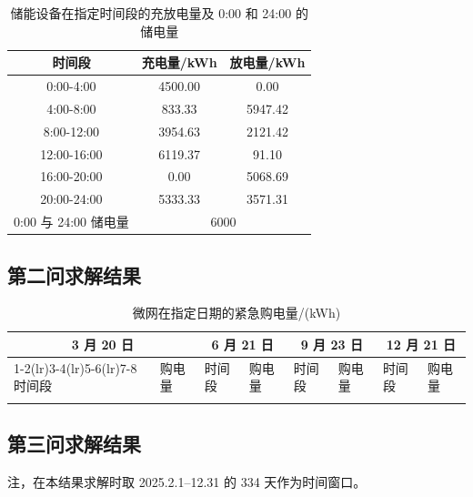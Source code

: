 \documentclass[zihao=-4,a4paper,fontset=none]{ctexart}
\begin{document}
\begin{table}[htbp]
\centering
\caption{储能设备在指定时间段的充放电量及 0:00 和 24:00 的储电量}
{\small
\begin{tabular}{ccc}
\toprule
时间段 & 充电量/kWh & 放电量/kWh \\
\midrule
0:00-4:00 & 4500.00 & 0.00 \\
4:00-8:00 & 833.33 & 5947.42 \\
8:00-12:00 & 3954.63 & 2121.42 \\
12:00-16:00 & 6119.37 & 91.10 \\
16:00-20:00 & 0.00 & 5068.69 \\
20:00-24:00 & 5333.33 & 3571.31 \\
\midrule
0:00 与 24:00 储电量 & \multicolumn{2}{c}{6000} \\
\bottomrule
\end{tabular}}
\label{tab:charge}
\end{table}
\newpage
\subsection{第二问求解结果}

\begin{table}[htbp]
\centering
\caption{微网在指定日期的紧急购电量/(kWh)}
{\footnotesize
\begin{tabular}{llllllll}
\toprule
\multicolumn{2}{c}{3 月 20 日} & \multicolumn{2}{c}{6 月 21 日}
& \multicolumn{2}{c}{9 月 23 日} & \multicolumn{2}{c}{12 月 21 日} \\\cmidrule(lr){1-2}\cmidrule(lr){3-4}\cmidrule(lr){5-6}\cmidrule(lr){7-8}
时间段 & 购电量 & 时间段 & 购电量 & 时间段 & 购电量 & 时间段 & 购电量 \\
\midrule
\\
\bottomrule
\end{tabular}}
\label{tab:p2day3}
\end{table}
\newpage
\subsection{第三问求解结果}
注，在本结果求解时取 2025.2.1–12.31 的 334 天作为时间窗口。
\end{document}
